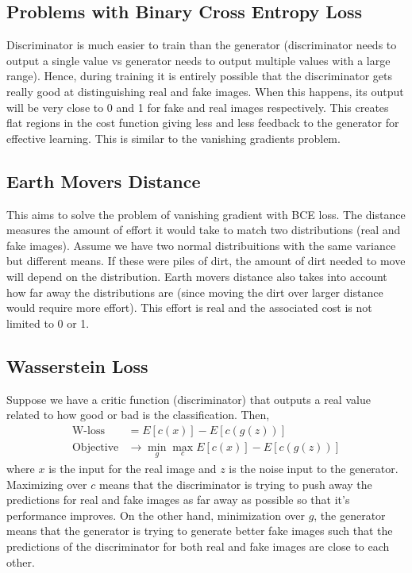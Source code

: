 \documentclass[../gan.tex]{subfiles}
\begin{document}
\subsection{Problems with Binary Cross Entropy Loss}
Discriminator is much easier to train than the generator (discriminator needs to output a single value vs generator needs to output multiple values with a large range). Hence, during training it is entirely possible that the discriminator gets really good at distinguishing real and fake images. When this happens, its output will be very close to 0 and 1 for fake and real images respectively. This creates flat regions in the cost function giving less and less feedback to the generator for effective learning. This is similar to the vanishing gradients problem.

\subsection{Earth Movers Distance}
This aims to solve the problem of vanishing gradient with BCE loss. The distance measures the amount of effort it would take to match two distributions (real and fake images). Assume we have two normal distribuitions with the same variance but different means. If these were piles of dirt, the amount of dirt needed to move will depend on the distribution. Earth movers distance also takes into account how far away the distributions are (since moving the dirt over larger distance would require more effort). This effort is real and the associated cost is not limited to 0 or 1.

\subsection{Wasserstein Loss}
Suppose we have a critic function (discriminator) that outputs a real value related to how good or bad is the classification. Then,
\begin{align*}
    \text{W-loss} &= E[c(x)] - E[c(g(z))]\\
    \text{Objective} &\rightarrow \min_{g}\max_{c} E[c(x)] - E[c(g(z))]
\end{align*}
where $x$ is the input for the real image and $z$ is the noise input to the generator. Maximizing over $c$ means that the discriminator is trying to push away the predictions for real and fake images as far away as possible so that it's performance improves. On the other hand, minimization over $g$, the generator means that the generator is trying to generate better fake images such that the predictions of the discriminator for both real and fake images are close to each other.
\end{document}
